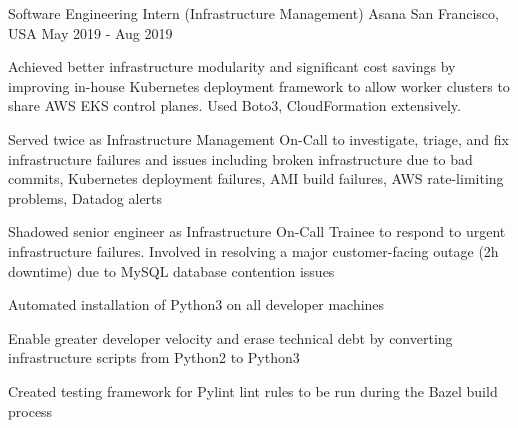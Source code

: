 

\begin{cventries}


  \cventry
  {Software Engineering Intern (Infrastructure Management)} %
    {Asana} %
    {San Francisco, USA} %
    {May 2019 - Aug 2019} %
    {
      \begin{cvitems} %
      \item {Achieved better infrastructure modularity and significant cost savings by improving in-house Kubernetes deployment framework to allow worker clusters to share AWS EKS control planes. Used Boto3, CloudFormation extensively.}
      \item {Served twice as Infrastructure Management On-Call to investigate, triage, and fix infrastructure failures and issues including broken infrastructure due to bad commits, Kubernetes deployment failures, AMI build failures, AWS rate-limiting problems, Datadog alerts}
      \item {Shadowed senior engineer as Infrastructure On-Call Trainee to respond to urgent infrastructure failures. Involved in resolving a major customer-facing outage (2h downtime) due to MySQL database contention issues}
      \item {Automated installation of Python3 on all developer machines}
      \item {Enable greater developer velocity and erase technical debt by converting infrastructure scripts from Python2 to Python3}
      \item {Created testing framework for Pylint lint rules to be run during the Bazel build process}
      \end{cvitems}
    }


\end{cventries}
